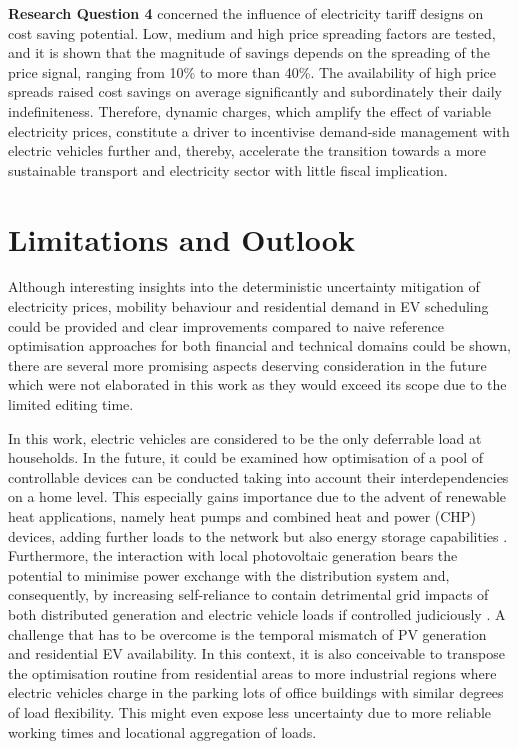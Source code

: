 \newpage
\textbf{Research Question 4} concerned the influence of electricity tariff designs on cost saving potential. Low, medium and high price spreading factors are tested, and it is shown that the magnitude of savings depends on the spreading of the price signal, ranging from 10\% to more than 40\%. The availability of high price spreads raised cost savings on average significantly and subordinately their daily indefiniteness. Therefore, dynamic charges, which amplify the effect of variable electricity prices, constitute a driver to incentivise demand-side management with electric vehicles further and, thereby, accelerate the transition towards a more sustainable transport and electricity sector with little fiscal implication.

\section{Limitations and Outlook}

Although interesting insights into the deterministic uncertainty mitigation of electricity prices, mobility behaviour and residential demand in EV scheduling could be provided and clear improvements compared to naive reference optimisation approaches for both financial and technical domains could be shown, there are several more promising aspects deserving consideration in the future which were not elaborated in this work as they would exceed its scope due to the limited editing time.

In this work, electric vehicles are considered to be the only deferrable load at households. In the future, it could be examined how optimisation of a pool of controllable devices can be conducted taking into account their interdependencies on a home level. This especially gains importance due to the advent of renewable heat applications, namely heat pumps and combined heat and power (CHP) devices, adding further loads to the network but also energy storage capabilities \cite{Neumann2016}. Furthermore, the interaction with local photovoltaic generation bears the potential to minimise power exchange with the distribution system and, consequently, by increasing self-reliance to contain detrimental grid impacts of both distributed generation and electric vehicle loads if controlled judiciously \cite{Allerding2014}. A challenge that has to be overcome is the temporal mismatch of PV generation and residential EV availability. In this context, it is also conceivable to transpose the optimisation routine from residential areas to more industrial regions where electric vehicles charge in the parking lots of office buildings with similar degrees of load flexibility. This might even expose less uncertainty due to more reliable working times and locational aggregation of loads.

